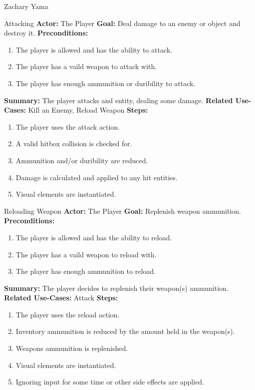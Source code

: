 \documentclass[12pt]{report}
\begin{document}
\begin{section}{Zachary Yama}

\begin{subsection}{Attacking}
\textbf{Actor:} The Player
\textbf{Goal:} Deal damage to an enemy or object and destroy it.
\textbf{Preconditions:}
\begin{enumerate}
	\item The player is allowed and has the ability to attack.
	\item The player has a vaild weapon to attack with.
	\item The player has enough ammunition or duribility to attack.
\end{enumerate}
\textbf{Summary:} The player attacks and entity, dealing some damage.
\textbf{Related Use-Cases:} Kill an Enemy, Reload Weapon
\textbf{Steps:}
\begin{enumerate}
	\item The player uses the attack action.
	\item A valid hitbox collision is checked for.
	\item Ammunition and/or duribility are reduced.
	\item Damage is calculated and applied to any hit entities.
	\item Visual elements are instantiated.
\end{enumerate}
\end{subsection}

\begin{subsection}{Reloading Weapon}
\textbf{Actor:} The Player
\textbf{Goal:} Replenish weapon ammunition.
\textbf{Preconditions:}
\begin{enumerate}
	\item The player is allowed and has the ability to reload.
	\item The player has a vaild weapon to reload with.
	\item The player has enough ammunition to reload.
\end{enumerate}
\textbf{Summary:} The player decides to replenish their weapon(s) ammunition.
\textbf{Related Use-Cases:} Attack
\textbf{Steps:}
\begin{enumerate}
	\item The player uses the reload action.
	\item Inventory ammunition is reduced by the amount held in the weapon(s).
	\item Weapons ammunition is replenished.
	\item Visual elements are instantiated.
	\item Ignoring input for some time or other side effects are applied.
\end{enumerate}
\end{subsection}


\end{section}
\end{document}
